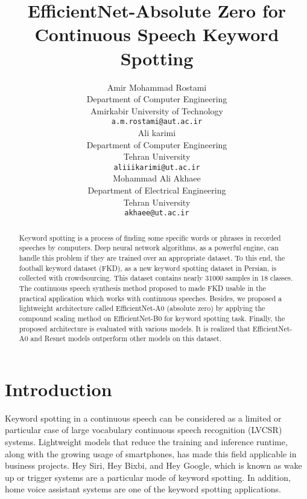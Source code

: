 \documentclass{article}
\title{EfficientNet-Absolute Zero for Continuous Speech Keyword Spotting}
\author{
  Amir Mohammad Rostami\\
  Department of Computer Engineering \\
  Amirkabir University of Technology\\
  \texttt{a.m.rostami@aut.ac.ir} \\
\And
 Ali karimi \\
  Department of Computer Engineering \\
  Tehran University\\
 \texttt{aliiikarimi@ut.ac.ir} \\
 \And
 Mohammad Ali Akhaee \\
  Department of Electrical Engineering\\
  Tehran University\\
    \texttt{akhaee@ut.ac.ir} \\
}
\begin{document}
\maketitle

\begin{abstract}
Keyword spotting is a process of finding some specific words or phrases in recorded speeches by computers. Deep neural network algorithms, as a powerful engine, can handle this problem if they are trained over an appropriate dataset. To this end, the football keyword dataset (FKD), as a new keyword spotting dataset in Persian, is collected with crowdsourcing. This dataset contains nearly 31000 samples in 18 classes. The continuous speech synthesis method proposed to made FKD usable in the practical application which works with continuous speeches. Besides, we proposed a lightweight architecture called EfficientNet-A0 (absolute zero) by applying the compound scaling method on EfficientNet-B0 for keyword spotting task. Finally, the proposed architecture is evaluated with various models. It is realized that EfficientNet-A0 and Resnet models outperform other models on this dataset.



\end{abstract}




\section{Introduction}

Keyword spotting in a continuous speech can be considered as a limited or particular case of large vocabulary continuous speech recognition (LVCSR) systems. Lightweight models that reduce the training and inference runtime, along with the growing usage of smartphones, has made this field applicable in business projects. Hey Siri, Hey Bixbi, and Hey Google, which is known as wake up or trigger systems are a particular mode of keyword spotting. In addition, home voice assistant systems are one of the keyword spotting applications.
\end{document}
